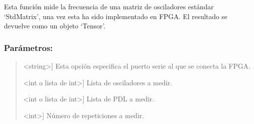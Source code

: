 \documentclass[letterpaper,10pt,english]{sphinxmanual}
\begin{document}
\begin{fulllineitems}
\begin{fulllineitems}
\begin{quote}
\begin{description}
\end{description}
\end{quote}

\end{fulllineitems}


\begin{fulllineitems}
\label{\detokenize{myfpga:myfpga.ring_osc.StdMatrix.medir}}
\pysigstartsignatures
{}
\pysigstopsignatures
\sphinxAtStartPar
Esta función mide la frecuencia de una matriz de osciladores estándar 
‘StdMatrix’, una vez esta ha sido implementado en FPGA. El resultado 
se devuelve como un objeto ‘Tensor’.


\subsubsection{Parámetros:}
\label{\detokenize{myfpga:id6}}\begin{quote}
\begin{description}
\sphinxlineitem{puerto}{[}\textless{}string\textgreater{}{]}
\sphinxAtStartPar
Esta opción especifica el puerto serie al que se conecta la 
FPGA.

\sphinxlineitem{osc}{[}\textless{}int o lista de int\textgreater{}{]}
\sphinxAtStartPar
Lista de osciladores a medir.

\sphinxlineitem{pdl}{[}\textless{}int o lista de int\textgreater{}{]}
\sphinxAtStartPar
Lista de PDL a medir.

\sphinxlineitem{N\_rep}{[}\textless{}int\textgreater{}{]}
\sphinxAtStartPar
Número de repeticiones a medir.


\end{description}
\end{quote}
\end{fulllineitems}
\end{fulllineitems}
\end{document}
